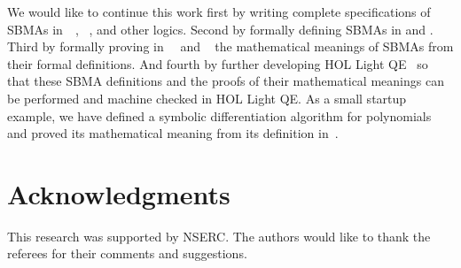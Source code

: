 \documentclass[fleqn]{llncs}
\begin{document}
We would like to continue this work first by writing complete
specifications of SBMAs in~{\churchuqe}~\cite{Farmer17},
{\churchqe}~\cite{Farmer18}, and other logics.  Second by formally
defining SBMAs in {\churchuqe} and {\churchqe}.  Third by formally
proving in~{\churchuqe}~\cite{Farmer17} and
{\churchqe}~\cite{Farmer18} the mathematical meanings of SBMAs from
their formal definitions.  And fourth by further developing HOL Light
QE~\cite{CaretteFarmerLaskowski18} so that these SBMA definitions and
the proofs of their mathematical meanings can be performed and machine
checked in HOL Light QE.  As a small startup example, we have defined
a symbolic differentiation algorithm for polynomials and proved its
mathematical meaning from its definition in~\cite[subsections 4.4 and
  9.3]{Farmer18}.

\section*{Acknowledgments} 

This research was supported by NSERC.  The authors would like to thank
the referees for their comments and suggestions.




\setcounter{tocdepth}{1}
\setcounter{tocdepth}{0}
\end{document}
